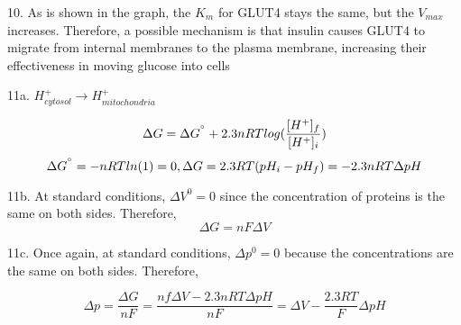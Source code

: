 \documentclass{article}
\begin{document}
10. As is shown in the graph, the $K_m$ for GLUT4 stays the same, but the $V_{max}$ increases. Therefore, a possible mechanism is that insulin causes GLUT4 to migrate from internal membranes to the plasma membrane, increasing their effectiveness in moving glucose into cells 
\vspace{5mm}

11a. $H^+_{cytosol} \rightarrow H^+_{mitochondria}$

$$\Delta G=\Delta G^{\degree} + 2.3nRTlog(\frac{[H^+]_f}{[H^+]_i})$$
$$\Delta G^{\degree}=-nRTln(1)=0,\Delta G=2.3RT(pH_i-pH_f)=-2.3nRT\Delta pH$$

11b. At standard conditions, $\Delta V^0=0$ since the concentration of proteins is the same on both sides. Therefore,
$$\Delta G=nF\Delta V$$

11c. Once again, at standard conditions, $\Delta p^0 =0$ because the concentrations are the same on both sides. Therefore,

$$\Delta p = \frac{\Delta G}{nF}=\frac{nf\Delta V-2.3nRT\Delta pH}{nF}=\Delta V - \frac{2.3RT}{F}\Delta pH$$
\end{document}

